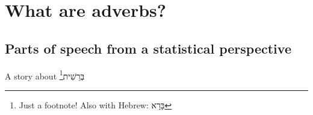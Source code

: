 
\chapter{What are adverbs?}  %



\section{Parts of speech from a statistical perspective}

A story about \texthebrew{בְּרֵשִׁית}\footnote{Just a footnote! Also with Hebrew: \texthebrew{בָּרָא}}